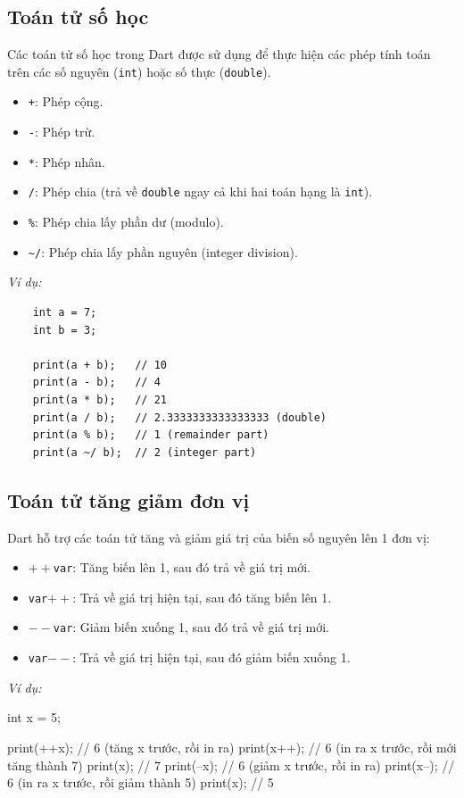 \documentclass[../DoAn.tex]{subfiles}
\numberwithin{figure}{chapter}
\begin{document}
\subsection{Toán tử số học}
Các toán tử số học trong Dart được sử dụng để thực hiện các phép tính toán trên các số nguyên (\texttt{int}) hoặc số thực (\texttt{double}). 
\begin{itemize}
\item \texttt{+}: Phép cộng.
\item \texttt{-}: Phép trừ.
\item \texttt{*}: Phép nhân.
\item \texttt{/}: Phép chia (trả về \texttt{double} ngay cả khi hai toán hạng là \texttt{int}).
\item \texttt{\%}: Phép chia lấy phần dư (modulo).
\item \texttt{\textasciitilde/}: Phép chia lấy phần nguyên (integer division).
\end{itemize}

\textit{Ví dụ:} 
\begin{lstlisting}
    int a = 7;
    int b = 3;
    
    print(a + b);   // 10
    print(a - b);   // 4
    print(a * b);   // 21
    print(a / b);   // 2.3333333333333333 (double)
    print(a % b);   // 1 (remainder part)
    print(a ~/ b);  // 2 (integer part)     
\end{lstlisting}

\subsection{Toán tử tăng giảm đơn vị}
Dart hỗ trợ các toán tử tăng và giảm giá trị của biến số nguyên lên 1 đơn vị:
\begin{itemize}
\item \texttt{$++$var}: Tăng biến lên 1, sau đó trả về giá trị mới.
\item \texttt{var$++$}: Trả về giá trị hiện tại, sau đó tăng biến lên 1.
\item \texttt{$--$var}: Giảm biến xuống 1, sau đó trả về giá trị mới.
\item \texttt{var$--$}: Trả về giá trị hiện tại, sau đó giảm biến xuống 1.
\end{itemize}

\textit{Ví dụ:}
\begin{myverbatim}
int x = 5;

print(++x); // 6 (tăng x trước, rồi in ra)
print(x++); // 6 (in ra x trước, rồi mới tăng thành 7)
print(x);   // 7
print(--x); // 6 (giảm x trước, rồi in ra)
print(x--); // 6 (in ra x trước, rồi giảm thành 5)
print(x);   // 5
\end{myverbatim}
\end{document}
